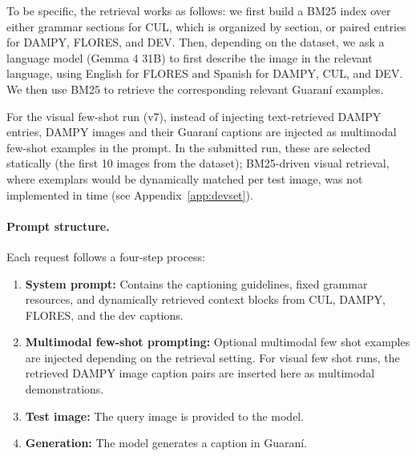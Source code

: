 \documentclass[11pt]{article}
\begin{document}
To be specific, the retrieval works as follows: we first build a BM25 index over either grammar sections for CUL, which is organized by section, or paired entries for DAMPY, FLORES, and DEV. Then, depending on the dataset, we ask a language model (Gemma 4 31B) to first describe the image in the relevant language, using English for FLORES and Spanish for DAMPY, CUL, and DEV. We then use BM25 to retrieve the corresponding relevant Guaran\'{i} examples.

For the visual few-shot run (v7), instead of injecting text-retrieved DAMPY entries, DAMPY images and their Guaran\'{i} captions are injected as multimodal few-shot examples in the prompt. In the submitted run, these are selected statically (the first 10 images from the dataset); BM25-driven visual retrieval, where exemplars would be dynamically matched per test image, was not implemented in time (see Appendix~\ref{app:devset}).


\paragraph{Prompt structure.}
Each request follows a four-step process:
\begin{enumerate}
    \item \textbf{System prompt:}
    Contains the captioning guidelines, fixed grammar resources,
    and dynamically retrieved context blocks from CUL, DAMPY,
    FLORES, and the dev captions.

    \item \textbf{Multimodal few-shot prompting:}
    Optional multimodal few shot examples are injected depending
    on the retrieval setting. For visual few shot runs, the
    retrieved DAMPY image caption pairs are inserted here as
    multimodal demonstrations.

    \item \textbf{Test image:}
    The query image is provided to the model.

    \item \textbf{Generation:}
    The model generates a caption in Guaran\'{i}.
\end{enumerate}
\end{document}
